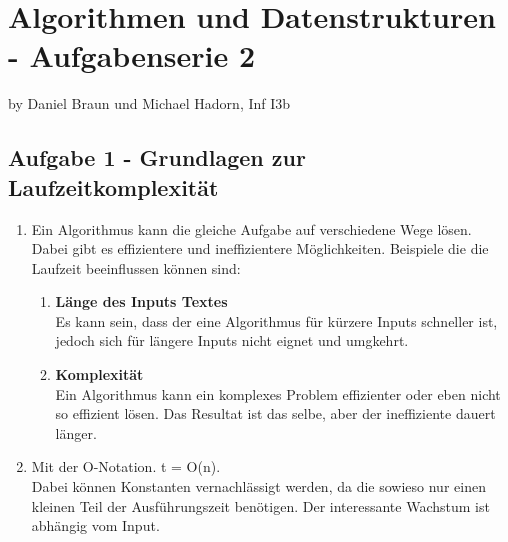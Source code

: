 \chapter*{Algorithmen und Datenstrukturen - Aufgabenserie 2}
\begin{flushright}
by Daniel Braun und Michael Hadorn, Inf I3b
\end{flushright}
\section*{Aufgabe 1 - Grundlagen zur Laufzeitkomplexität}
\begin{enumerate}
	\item %
	Ein Algorithmus kann die gleiche Aufgabe auf verschiedene Wege lösen. Dabei gibt es effizientere und ineffizientere Möglichkeiten.
	Beispiele die die Laufzeit beeinflussen können sind:
	\begin{enumerate}
		\item \textbf{Länge des Inputs Textes}\\
			Es kann sein, dass der eine Algorithmus für kürzere Inputs schneller ist, jedoch sich für längere Inputs nicht eignet und umgkehrt.
		
		\item \textbf{Komplexität}\\
			Ein Algorithmus kann ein komplexes Problem effizienter oder eben nicht so effizient lösen. Das Resultat ist das selbe, aber der ineffiziente dauert länger.
		
				
			
	\end{enumerate}
	
	\item %
	Mit der O-Notation. t = O(n).\\
	Dabei können Konstanten vernachlässigt werden, da die sowieso nur einen kleinen Teil der Ausführungszeit benötigen. Der interessante Wachstum ist abhängig vom Input.
	

\end{enumerate}
